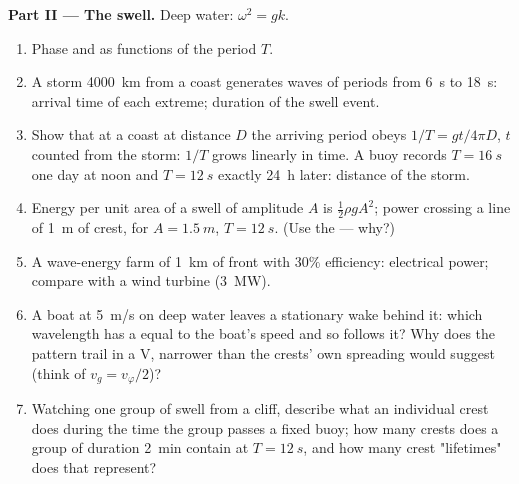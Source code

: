 \begin{problem}
\medskip
\noindent\textbf{Part II --- The swell.}
Deep water: $\omega^2 = gk$.
\begin{enumerate}[resume]
  \item Phase and  as functions of the period $T$.
  \item A storm \qty{4000}{km} from a coast generates waves of periods
        from \qty{6}{s} to \qty{18}{s}: arrival time of each extreme;
        duration of the swell event.
  \item Show that at a coast at distance $D$ the arriving period obeys
        $1/T = gt/4\pi D$, $t$ counted from the storm: $1/T$ grows
        linearly in time. A buoy records $T = \qty{16}{s}$ one day at noon
        and $T = \qty{12}{s}$ exactly \qty{24}{h} later: distance of the
        storm.
  \item Energy per unit area of a swell of amplitude $A$ is $\tfrac12\rho
        gA^2$; power crossing a line of \qty{1}{m} of crest, for $A =
        \qty{1.5}{m}$, $T = \qty{12}{s}$. (Use the  --- why?)
  \item A wave-energy farm of \qty{1}{km} of front with $30\%$ efficiency:
        electrical power; compare with a wind turbine (\qty{3}{MW}).
  \item A boat at \qty{5}{m/s} on deep water leaves a stationary wake
        behind it: which wavelength has a  equal to the
        boat's speed and so follows it? Why does the pattern trail in
        a V, narrower than the crests' own spreading would suggest
        (think of $v_g = v_\varphi/2$)?
  \item Watching one group of swell from a cliff, describe what an
        individual crest does during the time the group passes a
        fixed buoy; how many crests does a group of duration
        \qty{2}{min} contain at $T = \qty{12}{s}$, and how many crest
        "lifetimes" does that represent?
\end{enumerate}


\end{problem}
